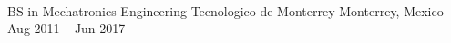 \documentclass[]{awesome-cv}
\begin{document}
    
\begin{center}
	  \\
	\vspace{2mm}
	{}
\end{center}

\vspace{-2mm}
\begin{cventries}
	\cventry
	{BS in Mechatronics Engineering}
	{Tecnologico de Monterrey}
	{Monterrey, Mexico}
	{Aug 2011 – Jun 2017}
	{}
\end{cventries}
\end{document}
